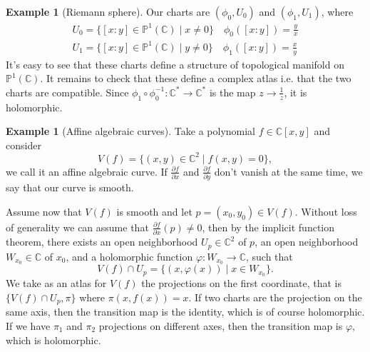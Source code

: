 \documentclass[12pt,a4paper,openright,twoside]{report}
\theoremstyle{definition} %
\newtheorem{example}[theorem]{Example}
\def \C {\mathbb{C}}
\def \de {\partial}
\def \PP {\mathbb{P}^1(\C)}
\begin{document}
\begin{example}[Riemann sphere]
    Our charts are \( (\phi_0,U_0)\) and \((\phi_1,U_1)\), where
    \begin{align*}
        U_0 = \{ [x:y] \in \PP \mid x \neq 0 \} \quad \phi_0 ([x:y])=\frac{y}{x}\\
        U_1 = \{ [x:y] \in \PP \mid y \neq 0 \} \quad \phi_1 ([x:y])=\frac{x}{y}
    \end{align*}
    It's easy to see that these charts define a structure of topological manifold on \(\PP\).
    It remains to check that these define a complex atlas i.e. that the two charts are compatible.
    Since \( \phi_1 \circ \phi_0^{-1}: \C^* \to \C^*\) is the map \(z \to \frac{1}{z}\), it is holomorphic.

    
\end{example}
    
\begin{example}[Affine algebraic curves]
    Take a polynomial \(f \in \C[x,y]\) and consider
    \[
    V(f) = \{(x,y) \in \C^2 \mid f(x,y) = 0\},
    \]
    we call it an affine algebraic curve.
    If \(\frac{ \de f}{\de x} \) and \(\frac{ \de f}{\de y} \) don't vanish at the same time, we say that our curve is smooth.
    
    Assume now that \(V(f)\) is smooth and let \(p = (x_0,y_0) \in V(f)\).
    Without loss of generality we can assume that \(\frac{ \de f}{\de x}(p) \neq 0\), then by the implicit function theorem, there exists an open neighborhood \(U_p \in \C^2\) of \(p\), an open neighborhood \(W_{x_0} \in \C\) of \(x_0\), and a holomorphic function \(\varphi : W_{x_0} \to \C\), such that
    \[
    V(f) \cap U_p = \{(x,\varphi(x)) \mid x \in W_{x_0}\}.
    \]
    We take as an atlas for \(V(f)\) the projections on the first coordinate, that is \( \{V(f) \cap U_p, \pi\}\) where \(\pi(x,f(x))=x\).
    If two charts are the projection on the same axis, then the transition map is the identity, which is of course holomorphic. If we have \(\pi_1\) and \(\pi_2\) projections on different axes, then the transition map is \(\varphi\), which is holomorphic.
\end{example}
\end{document}
